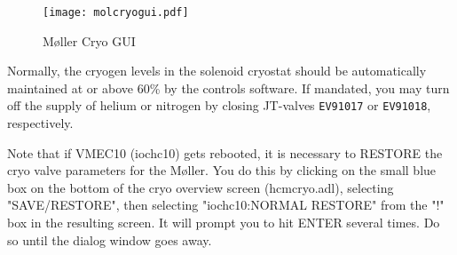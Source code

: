 {\begin{figure}
\begin{center}
\texttt{[image: molcryogui.pdf]}
\caption{M\o ller Cryo GUI\label{molcryomedm}}
\end{center}
\end{figure}
%

Normally, the cryogen levels in the solenoid cryostat should be
automatically maintained at or above 60\% by the controls software.
If mandated, you may turn off the supply of helium or nitrogen by
closing JT-valves {\tt EV91017} or {\tt EV91018}, respectively.

Note that if VMEC10 (iochc10) gets rebooted, it is necessary to RESTORE the cryo valve
parameters for the M\o ller. You do this by clicking on the small blue box on the
bottom of the cryo overview screen (hcmcryo.adl), selecting "SAVE/RESTORE",
then selecting "iochc10:NORMAL RESTORE" from the "!" box in the resulting
screen. It will prompt you to hit ENTER several times. Do so until the dialog
window goes away.

}
